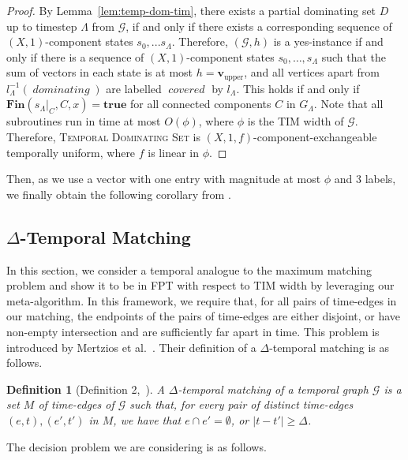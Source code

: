 \documentclass[a4paper,UKenglish,cleveref, autoref, thm-restate]{lipics-v2021} %
\DeclareMathOperator{\covered}{\textit{covered}}
\DeclareMathOperator{\dominating}{\textit{dominating}}
\newcounter{ctheorem}
\newtheorem{defn}[ctheorem]{Definition}
\begin{document}
\begin{toappendix}
\begin{proof}
     By Lemma~\ref{lem:temp-dom-tim}, there exists a partial dominating set $D$ up to timestep $\Lambda$ from $\mathcal{G}$, if and only if there exists a corresponding sequence of $(X,1)$-component states $s_0, ... s_{\Lambda}$. Therefore, $(\mathcal{G},h)$ is a yes-instance if and only if there is a sequence of $(X,1)$-component states $s_0,\ldots,s_{\Lambda}$ such that the sum of vectors in each state is at most $h=\textbf{v}_{\text{upper}}$, and all vertices apart from $l_{\Lambda}^{-1}(\dominating)$ are labelled $\covered$ by $l_{\Lambda}$. This holds if and only if $\textbf{Fin}(s_{\Lambda}|_C,C,x)=\textbf{true}$ for all connected components $C$ in $G_{\Lambda}$. Note that all subroutines run in time at most $O(\phi)$, where $\phi$ is the TIM width of $\mathcal{G}$. Therefore, \textsc{Temporal Dominating Set} is $(X,1,f)$-component-exchangeable temporally uniform, where $f$ is linear in $\phi$. 
 \end{proof}
 Then, as we use a vector with one entry with magnitude at most $\phi$ and 3 labels, we finally obtain the following corollary from . 

\TIMdomset*


\subsection{\texorpdfstring{$\Delta$}{Delta}-Temporal Matching}\label{sec:matching}

In this section, we consider a temporal analogue to the maximum matching problem and show it to be in FPT with respect to TIM width by leveraging our meta-algorithm. In this framework, we require that, for all pairs of time-edges in our matching, the endpoints of the pairs of time-edges are either disjoint, or have non-empty intersection and are sufficiently far apart in time. This problem is introduced by Mertzios et al.~\cite{mertzios_computing_2023}. Their definition of a $\Delta$-temporal matching is as follows. 

\begin{defn}[Definition 2,~\cite{mertzios_computing_2023}]
    A \emph{$\Delta$-temporal matching} of a temporal graph $\mathcal{G}$ is a set $M$ of time-edges of $\mathcal{G}$ such that, for every pair of distinct time-edges $(e,t),(e',t')$ in $M$, we have that $e\cap e'=\emptyset$, or $|t-t'|\geq \Delta$.
\end{defn}

The decision problem we are considering is as follows.


\end{toappendix}
\end{document}
